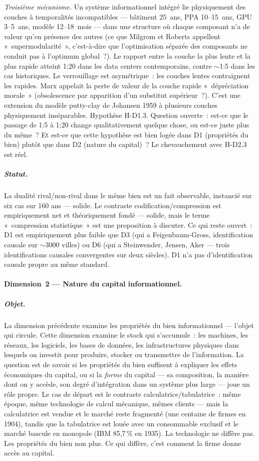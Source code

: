 \emph{Troisième mécanisme.} Un système informationnel intégré lie physiquement des couches à temporalités incompatibles --- bâtiment 25~ans, PPA 10--15~ans, GPU 3--5~ans, modèle 12--18~mois --- dans une structure où chaque composant n'a de valeur qu'en présence des autres (ce que Milgrom et Roberts appellent «~supermodularité~», c'est-à-dire que l'optimisation séparée des composants ne conduit pas à l'optimum global~?). Le rapport entre la couche la plus lente et la plus rapide atteint 1:20 dans les data centers contemporains, contre $\sim$1:5 dans les cas historiques. Le verrouillage est asymétrique~: les couches lentes contraignent les rapides. Marx appelait la perte de valeur de la couche rapide «~dépréciation morale~» (obsolescence par apparition d'un substitut supérieur~?). C'est une extension du modèle putty-clay de Johansen 1959 à plusieurs couches physiquement inséparables. Hypothèse H-D1.3. Question ouverte~: est-ce que le passage de 1:5 à 1:20 change qualitativement quelque chose, ou est-ce juste plus du même~? Et est-ce que cette hypothèse est bien logée dans D1 (propriétés du bien) plutôt que dans D2 (nature du capital)~? Le chevauchement avec H-D2.3 est réel.

\subparagraph{Statut.}
La dualité rival/non-rival dans le même bien est un fait observable, instancié sur six cas sur 160 ans --- solide. Le contraste codification/compression est empiriquement net et théoriquement fondé --- solide, mais le terme «~compression statistique~» est une proposition à discuter. Ce qui reste ouvert~: D1 est empiriquement plus faible que D3 (qui a Feigenbaum-Gross, identification causale sur $\sim$3000 villes) ou D6 (qui a Steinwender, Jensen, Aker --- trois identifications causales convergentes sur deux siècles). D1 n'a pas d'identification causale propre au même standard.


\paragraph{Dimension~2 --- Nature du capital informationnel.}

\subparagraph{Objet.}
La dimension précédente examine les propriétés du bien informationnel --- l'objet qui circule. Cette dimension examine le stock qui s'accumule~: les machines, les réseaux, les logiciels, les bases de données, les infrastructures physiques dans lesquels on investit pour produire, stocker ou transmettre de l'information. La question est de savoir si les propriétés du bien suffisent à expliquer les effets économiques du capital, ou si la \emph{forme} du capital --- sa composition, la manière dont on y accède, son degré d'intégration dans un système plus large --- joue un rôle propre. Le cas de départ est le contraste calculatrice/tabulatrice~: même époque, même technologie de calcul mécanique, mêmes clients --- mais la calculatrice est vendue et le marché reste fragmenté (une centaine de firmes en 1904), tandis que la tabulatrice est louée avec un consommable exclusif et le marché bascule en monopole (IBM 85,7\,\% en 1935). La technologie ne diffère pas. Les propriétés du bien non plus. Ce qui diffère, c'est comment la firme donne accès au capital.

